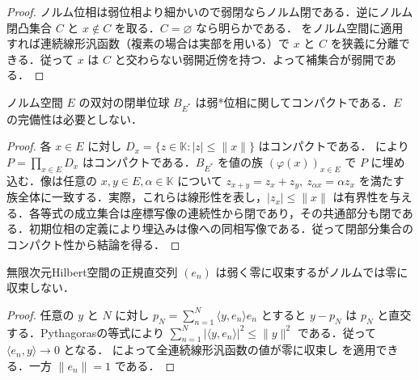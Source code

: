 \begin{proof}
ノルム位相は弱位相より細かいので弱閉ならノルム閉である．逆にノルム閉凸集合 $C$ と $x\notin C$ を取る．$C=\varnothing$ なら明らかである． をノルム空間に適用すれば連続線形汎函数（複素の場合は実部を用いる）で $x$ と $C$ を狭義に分離できる．従って $x$ は $C$ と交わらない弱開近傍を持つ．よって補集合が弱開である．
\end{proof}
\begin{prop}
ノルム空間 $E$ の双対の閉単位球 $B_{E^*}$ は弱*位相に関してコンパクトである．$E$ の完備性は必要としない．
\end{prop}
\begin{proof}
各 $x\in E$ に対し $D_x=\{z\in\mathbb K:|z|\leq\|x\|\}$ はコンパクトである． により $P=\prod_{x\in E}D_x$ はコンパクトである．$B_{E^*}$ を値の族 $(\varphi(x))_{x\in E}$ で $P$ に埋め込む．像は任意の $x,y\in E,\alpha\in\mathbb K$ について $z_{x+y}=z_x+z_y,\ z_{\alpha x}=\alpha z_x$ を満たす族全体に一致する．実際，これらは線形性を表し，$|z_x|\leq\|x\|$ は有界性を与える．各等式の成立集合は座標写像の連続性から閉であり，その共通部分も閉である．初期位相の定義により埋込みは像への同相写像である．従って閉部分集合のコンパクト性から結論を得る．
\end{proof}
\begin{example}[弱収束とノルム収束の相違]
無限次元Hilbert空間の正規直交列 $(e_n)$ は弱く零に収束するがノルムでは零に収束しない．
\end{example}
\begin{proof}
任意の $y$ と $N$ に対し $p_N=\sum_{n=1}^N\langle y,e_n\rangle e_n$ とすると $y-p_N$ は $p_N$ と直交する．Pythagorasの等式により $\sum_{n=1}^N|\langle y,e_n\rangle|^2\leq\|y\|^2$ である．従って $\langle e_n,y\rangle\to0$ となる． によって全連続線形汎函数の値が零に収束し  を適用できる．一方 $\|e_n\|=1$ である．
\end{proof}
